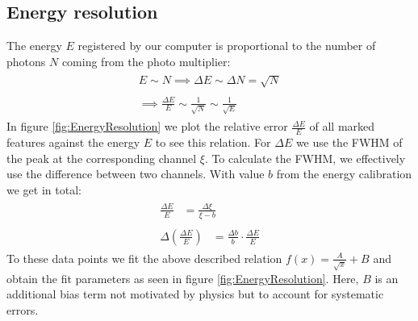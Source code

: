 \subsection*{Energy resolution}
%
The energy $E$ registered by our computer is proportional to the number of photons $N$ coming from the photo multiplier:
\begin{align}
    \label{eq:}
    \begin{split}
        E \sim N \implies \Delta E \sim \Delta N = \sqrt{N}
    \end{split}
    \\
    \label{eq:}
    \begin{split}
        \implies \frac{\Delta E}{E} \sim \frac{1}{\sqrt{N}} \sim \frac{1}{\sqrt{E}}
    \end{split}
\end{align}
%
In figure \ref{fig:EnergyResolution} we plot the relative error $\frac{\Delta E}{E}$ of all marked features against the energy $E$ to see this relation.
For $\Delta E$ we use the FWHM of the peak at the corresponding channel $\xi$.
To calculate the FWHM, we effectively use the difference between two channels.
With value $b$ from the energy calibration we get in total:
\begin{align}
    \label{eq:}
    \begin{split}
        \frac{\Delta E}{E} &= \frac{ \Delta \xi }{\xi - b}
    \end{split}
    \\
    \label{eq:}
    \begin{split}
        \Delta \left ( \frac{\Delta E}{E} \right ) &= \frac{ \Delta b }{ b } \cdot \frac{\Delta E}{E}
    \end{split}
\end{align}
%
To these data points we fit the above described relation $f(x) = \frac{A}{\sqrt{x}} + B$ and obtain the fit parameters as seen in figure \ref{fig:EnergyResolution}.
Here, $B$ is an additional bias term not motivated by physics but to account for systematic errors.
%
\par
%
\minipage{\linewidth}
